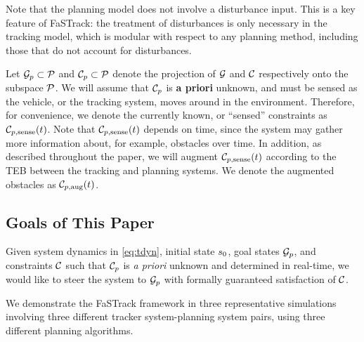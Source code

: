 Note that the planning model does not involve a disturbance input. 
This is a key feature of FaSTrack: the treatment of disturbances is only necessary in the tracking model, which is modular with respect to any planning method, including those that do not account for disturbances.

Let $\mathcal G_p \subset \mathcal{P}$ and $\mathcal C_p \subset \mathcal{P}$ denote the projection of $\mathcal G$ and $\mathcal C$ respectively onto the subspace $\mathcal{P}$.
We will assume that $\mathcal C_p$ is \textbf{a priori} unknown, and must be sensed as the vehicle, or the tracking system, moves around in the environment.
Therefore, for convenience, we denote the currently known, or ``sensed'' constraints as $\mathcal C_{p,\text{sense}}(t)$.
Note that $\mathcal C_{p,\text{sense}}(t)$ depends on time, since the system may gather more information about, for example, obstacles over time.
In addition, as described throughout the paper, we will augment $\mathcal C_{p,\text{sense}}(t)$ according to the TEB between the tracking and planning systems.
We denote the augmented obstacles as $\mathcal C_{p,\text{aug}}(t)$.

\subsection{Goals of This Paper}
Given system dynamics in \eqref{eq:tdyn}, initial state $s_0$, goal states $\mathcal G_p$, and constraints $\mathcal C$ such that $\mathcal C_p$ is \textit{a priori} unknown and determined in real-time, we would like to steer the system to $\mathcal G_p$ with formally guaranteed satisfaction of $\mathcal C$.



We demonstrate the FaSTrack framework in three representative simulations involving three different tracker system-planning system pairs, using three different planning algorithms.